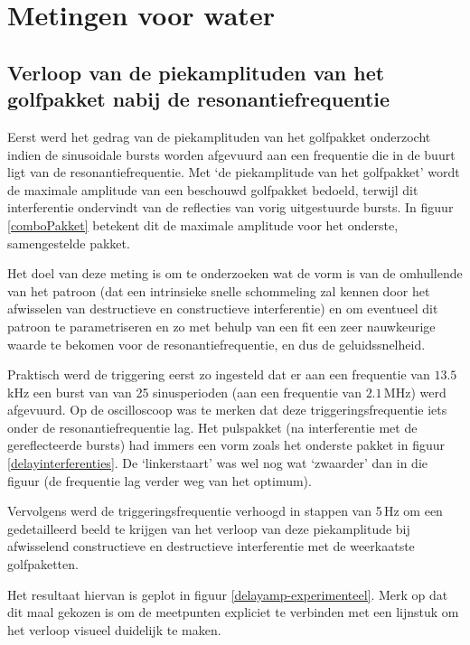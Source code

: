 \section{Metingen voor water}

\subsection{Verloop van de piekamplituden van het golfpakket nabij de 
resonantiefrequentie}
Eerst werd het gedrag van de piekamplituden van het golfpakket onderzocht 
indien de sinusoidale bursts worden afgevuurd aan een frequentie die in de 
buurt ligt van de resonantiefrequentie. Met `de piekamplitude van het 
golfpakket' wordt de maximale amplitude van een beschouwd golfpakket 
bedoeld, terwijl dit interferentie ondervindt van de reflecties van vorig 
uitgestuurde bursts. In figuur \ref{comboPakket} betekent dit de maximale 
amplitude voor het onderste, samengestelde pakket.

Het doel van deze meting is om te onderzoeken wat de vorm is van de 
omhullende van het patroon (dat een intrinsieke snelle schommeling zal 
kennen door het afwisselen van destructieve en constructieve interferentie) 
en om eventueel dit patroon te parametriseren en zo met behulp van een fit 
een zeer nauwkeurige waarde te bekomen voor de resonantiefrequentie, en dus 
de geluidssnelheid.

Praktisch werd de triggering eerst zo ingesteld dat er aan een frequentie 
van $13.5$\,kHz een burst van van 25 sinusperioden (aan een frequentie van 
$2.1$\,MHz) werd afgevuurd. Op de oscilloscoop was te merken dat deze 
triggeringsfrequentie iets onder de resonantiefrequentie lag. Het 
pulspakket (na interferentie met de gereflecteerde bursts) had immers een 
vorm zoals het onderste pakket in figuur \ref{delayinterferenties}. De 
`linkerstaart' was wel nog wat `zwaarder' dan in die figuur (de frequentie 
lag verder weg van het optimum).

Vervolgens werd de triggeringsfrequentie verhoogd in stappen van 5\,Hz om 
een gedetailleerd beeld te krijgen van het verloop van deze piekamplitude 
bij afwisselend constructieve en destructieve interferentie met de 
weerkaatste golfpaketten.

Het resultaat hiervan is geplot in figuur \ref{delayamp-experimenteel}.  
Merk op dat dit maal gekozen is om de meetpunten expliciet te verbinden met 
een lijnstuk om het verloop visueel duidelijk te maken.

